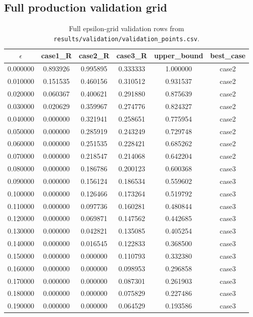 \documentclass[a4paper,twocolumn,11pt,unpublished]{quantumarticle}
\begin{document}
\subsection{Full production validation grid}
\begin{table}[t]
\centering
\scriptsize
\caption{Full epsilon-grid validation rows from
\texttt{results/validation/validation\_points.csv}.}
\label{tab:validation-grid-full-appendix}
\begin{tabular}{cccccc}
\hline
$\epsilon$ & case1\_R & case2\_R & case3\_R & upper\_bound & best\_case \\
\hline
0.000000 & 0.893926 & 0.995895 & 0.333333 & 1.000000 & case2 \\
0.010000 & 0.151535 & 0.460156 & 0.310512 & 0.931537 & case2 \\
0.020000 & 0.060367 & 0.400621 & 0.291880 & 0.875639 & case2 \\
0.030000 & 0.020629 & 0.359967 & 0.274776 & 0.824327 & case2 \\
0.040000 & 0.000000 & 0.321941 & 0.258651 & 0.775954 & case2 \\
0.050000 & 0.000000 & 0.285919 & 0.243249 & 0.729748 & case2 \\
0.060000 & 0.000000 & 0.251535 & 0.228421 & 0.685262 & case2 \\
0.070000 & 0.000000 & 0.218547 & 0.214068 & 0.642204 & case2 \\
0.080000 & 0.000000 & 0.186786 & 0.200123 & 0.600368 & case3 \\
0.090000 & 0.000000 & 0.156124 & 0.186534 & 0.559602 & case3 \\
0.100000 & 0.000000 & 0.126466 & 0.173264 & 0.519792 & case3 \\
0.110000 & 0.000000 & 0.097736 & 0.160281 & 0.480844 & case3 \\
0.120000 & 0.000000 & 0.069871 & 0.147562 & 0.442685 & case3 \\
0.130000 & 0.000000 & 0.042821 & 0.135085 & 0.405254 & case3 \\
0.140000 & 0.000000 & 0.016545 & 0.122833 & 0.368500 & case3 \\
0.150000 & 0.000000 & 0.000000 & 0.110793 & 0.332380 & case3 \\
0.160000 & 0.000000 & 0.000000 & 0.098953 & 0.296858 & case3 \\
0.170000 & 0.000000 & 0.000000 & 0.087301 & 0.261903 & case3 \\
0.180000 & 0.000000 & 0.000000 & 0.075829 & 0.227486 & case3 \\
0.190000 & 0.000000 & 0.000000 & 0.064529 & 0.193586 & case3 \\

\end{tabular}
\end{table}
\end{document}

